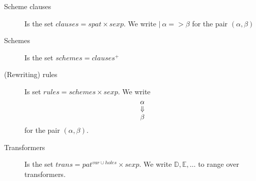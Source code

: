 \begin{description}
\item[Scheme clauses] Is the set $clauses = spat \times sexp$. We write $|\
  \alpha => \beta$ for the pair $(\alpha, \beta)$


\item[Schemes] Is the set $schemes = clauses^{+}$


\item[(Rewriting) rules] Is set $rules = schemes \times sexp$. We write
  \[
  \shortstack[ccc]{$\alpha$ \\ $\Downarrow$ \\ $\beta$}
  \]
  for the pair $(\alpha, \beta)$.


\item[Transformers] Is the set $trans = pat^{var \cup holes} \times sexp$. We
  write $\mathbb{D}, \mathbb{E}, \ldots$ to range over transformers.

\end{description}


